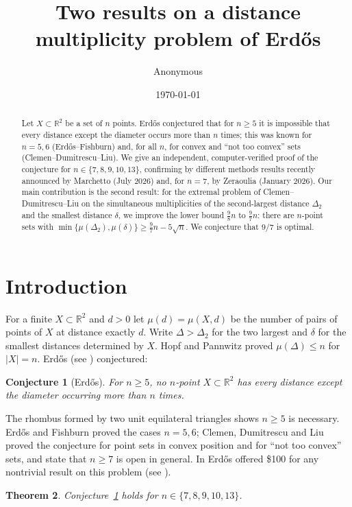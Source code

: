 \documentclass[11pt]{amsart}
\title{Two results on a distance multiplicity problem of Erd\H{o}s}
\author{Anonymous}
\date{\today}
\newtheorem{theorem}{Theorem}
\newtheorem{conjecture}[theorem]{Conjecture}
\newcommand{\R}{\mathbb{R}}
\newcommand{\md}{\mu}
\begin{document}
\begin{abstract}
Let $X\subset\R^2$ be a set of $n$ points. Erd\H{o}s conjectured that for $n\ge 5$ it is
impossible that every distance except the diameter occurs more than $n$ times; this was
known for $n=5,6$ (Erd\H{o}s--Fishburn) and, for all $n$, for convex and ``not too
convex'' sets (Clemen--Dumitrescu--Liu). We give an independent, computer-verified proof
of the conjecture for $n\in\{7,8,9,10,13\}$, confirming by different methods results
recently announced by Marchetto (July 2026) and, for $n=7$, by Zeraoulia (January 2026).
Our main contribution is the second result: for the extremal problem of
Clemen--Dumitrescu--Liu on the simultaneous multiplicities of the second-largest
distance $\Delta_2$ and the smallest distance $\delta$, we improve the lower bound
$\tfrac98 n$ to $\tfrac97 n$: there are $n$-point sets with
$\min\{\md(\Delta_2),\md(\delta)\}\ge \tfrac97 n-5\sqrt n$. We conjecture that $9/7$ is
optimal.
\end{abstract}
\maketitle

\section{Introduction}
For a finite $X\subset\R^2$ and $d>0$ let $\md(d)=\md(X,d)$ be the number of pairs of
points of $X$ at distance exactly $d$. Write $\Delta>\Delta_2$ for the two largest and
$\delta$ for the smallest distances determined by $X$. Hopf and Pannwitz \cite{HP34}
proved $\md(\Delta)\le n$ for $|X|=n$. Erd\H{o}s (see \cite{EF95,Blo132}) conjectured:

\begin{conjecture}[Erd\H{o}s]\label{conj}
For $n\ge5$, no $n$-point $X\subset\R^2$ has every distance except the diameter
occurring more than $n$ times.
\end{conjecture}

The rhombus formed by two unit equilateral triangles shows $n\ge5$ is necessary.
Erd\H{o}s and Fishburn \cite{EF95} proved the cases $n=5,6$; Clemen, Dumitrescu and Liu
\cite{CDL} proved the conjecture for point sets in convex position and for ``not too
convex'' sets, and state that $n\ge7$ is open in general. In \cite{Er97}
Erd\H{o}s offered \$100 for any nontrivial result on this problem
(see \cite{Blo132}).

\begin{theorem}\label{thm:small}
Conjecture~\ref{conj} holds for $n\in\{7,8,9,10,13\}$.
\end{theorem}
\end{document}

